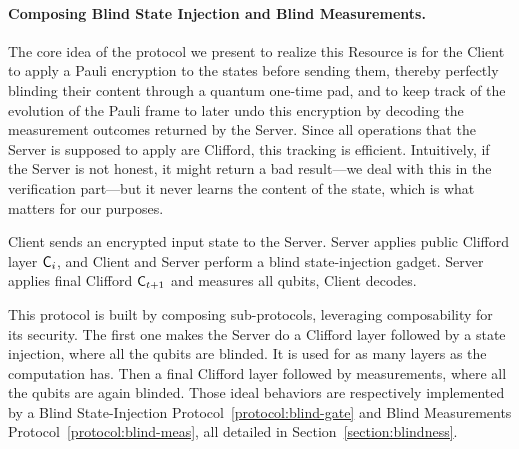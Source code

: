\paragraph{Composing Blind State Injection and Blind Measurements.}
The core idea of the protocol we present to realize this Resource is for the Client to apply a Pauli encryption to the states before sending them, thereby perfectly blinding their content through a quantum one-time pad, and to keep track of the evolution of the Pauli frame to later undo this encryption by decoding the measurement outcomes returned by the Server. Since all operations that the Server is supposed to apply are Clifford, this tracking is efficient. Intuitively, if the Server is not honest, it might return a bad result---we deal with this in the verification part---but it never learns the content of the state, which is what matters for our purposes.
\setcounter{informalprotocol}{3}
\begin{informalprotocol}
    \caption{Magic-Blind Delegated Quantum Computation}
    \label{informal:protocol:mblind_DQC}
    \begin{algorithmic}[0]
        \State Client sends an encrypted input state to the Server.
        \State Server applies public Clifford layer $\mathsf{C}_i$, and
        \State Client and Server perform a blind state-injection gadget.
        \EndFor
        \State Server applies final Clifford $\mathsf{C}_{t+1}$ and measures all qubits, Client decodes. 
    \end{algorithmic}
\end{informalprotocol}

This protocol is built by composing sub-protocols, leveraging composability for its security. The first one makes the Server do a Clifford layer followed by a state injection, where all the qubits are blinded. It is used for as many layers as the computation has. Then a final Clifford layer followed by measurements, where all the qubits are again blinded. Those ideal behaviors are respectively implemented by a Blind State-Injection Protocol~\ref{protocol:blind-gate} and Blind Measurements Protocol~\ref{protocol:blind-meas}, all detailed in Section~\ref{section:blindness}.


